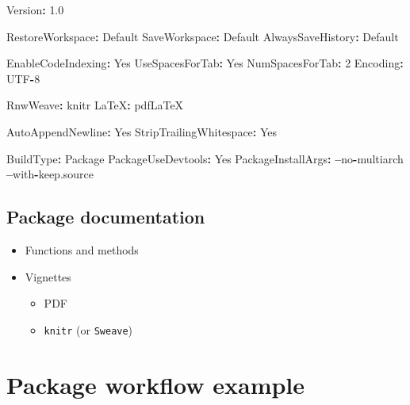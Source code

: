 \documentclass[]{book}
\newenvironment{Shaded}{\begin{snugshade}}{\end{snugshade}}
\newcommand{\DecValTok}[1]{\textcolor[rgb]{0.00,0.00,0.81}{#1}}
\newcommand{\FloatTok}[1]{\textcolor[rgb]{0.00,0.00,0.81}{#1}}
\newcommand{\StringTok}[1]{\textcolor[rgb]{0.31,0.60,0.02}{#1}}
\newcommand{\OperatorTok}[1]{\textcolor[rgb]{0.81,0.36,0.00}{\textbf{#1}}}
\newcommand{\NormalTok}[1]{#1}
\providecommand{\tightlist}{%
  \setlength{\itemsep}{0pt}\setlength{\parskip}{0pt}}
\theoremstyle{definition}
\theoremstyle{definition}
\theoremstyle{definition}
\theoremstyle{remark}
\begin{document}
\begin{Shaded}
\begin{Highlighting}[]
\NormalTok{Version}\OperatorTok{:}\StringTok{ }\FloatTok{1.0}

\NormalTok{RestoreWorkspace}\OperatorTok{:}\StringTok{ }\NormalTok{Default}
\NormalTok{SaveWorkspace}\OperatorTok{:}\StringTok{ }\NormalTok{Default}
\NormalTok{AlwaysSaveHistory}\OperatorTok{:}\StringTok{ }\NormalTok{Default}

\NormalTok{EnableCodeIndexing}\OperatorTok{:}\StringTok{ }\NormalTok{Yes}
\NormalTok{UseSpacesForTab}\OperatorTok{:}\StringTok{ }\NormalTok{Yes}
\NormalTok{NumSpacesForTab}\OperatorTok{:}\StringTok{ }\DecValTok{2}
\NormalTok{Encoding}\OperatorTok{:}\StringTok{ }\NormalTok{UTF}\OperatorTok{-}\DecValTok{8}

\NormalTok{RnwWeave}\OperatorTok{:}\StringTok{ }\NormalTok{knitr}
\NormalTok{LaTeX}\OperatorTok{:}\StringTok{ }\NormalTok{pdfLaTeX}

\NormalTok{AutoAppendNewline}\OperatorTok{:}\StringTok{ }\NormalTok{Yes}
\NormalTok{StripTrailingWhitespace}\OperatorTok{:}\StringTok{ }\NormalTok{Yes}

\NormalTok{BuildType}\OperatorTok{:}\StringTok{ }\NormalTok{Package}
\NormalTok{PackageUseDevtools}\OperatorTok{:}\StringTok{ }\NormalTok{Yes}
\NormalTok{PackageInstallArgs}\OperatorTok{:}\StringTok{ }\OperatorTok{--}\NormalTok{no}\OperatorTok{-}\NormalTok{multiarch }\OperatorTok{--}\NormalTok{with}\OperatorTok{-}\NormalTok{keep.source}
\end{Highlighting}
\end{Shaded}

\subsection{Package documentation}\label{package-documentation}

\begin{itemize}
\item
  Functions and methods
\item
  Vignettes

  \begin{itemize}
  \tightlist
  \item
    PDF
  \item
    \texttt{knitr} (or \texttt{Sweave})
  \end{itemize}
\end{itemize}

\section{Package workflow example}\label{package-workflow-example}
\end{document}
